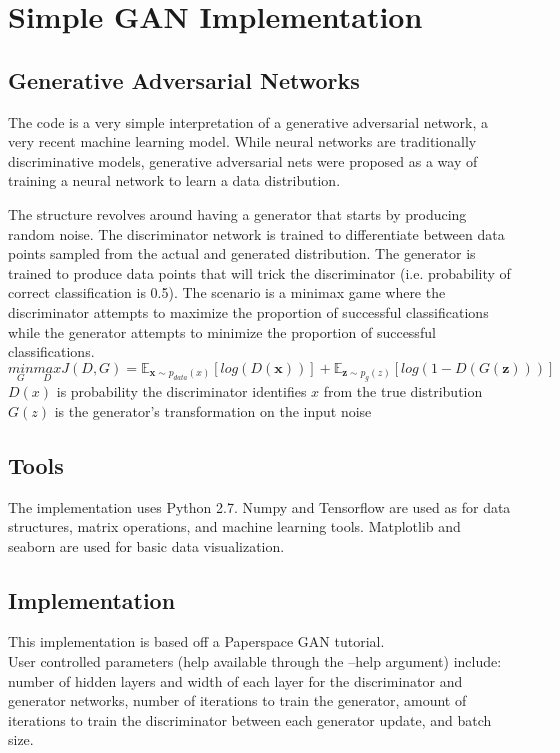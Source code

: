 \documentclass[12pt]{article}
\begin{document}
\section*{Simple GAN Implementation}

\subsection*{Generative Adversarial Networks}

\indent The code is a very simple interpretation of a generative adversarial network, a very recent machine learning model. While neural networks are traditionally discriminative models, generative adversarial nets were proposed as a way of training a neural network to learn a data distribution.

The structure revolves around having a generator that starts by producing random noise. The discriminator network is trained to differentiate between data points sampled from the actual and generated distribution. The generator is trained to produce data points that will trick the discriminator (i.e. probability of correct classification is 0.5). The scenario is a minimax game where the discriminator attempts to maximize the proportion of successful classifications while the generator attempts to minimize the proportion of successful classifications.
$$ \underset{G}{min} \underset{D}{max} J(D,G)=\mathbb{E}_{\textbf{x}\sim p_{data}(x)}[log(D(\textbf{x}))]+\mathbb{E}_{\textbf{z}\sim p_{g}(z)}[log(1-D(G(\textbf{z})))]$$
$D(x)$ is probability the discriminator identifies $x$ from the true distribution\\
$G(z)$ is the generator's transformation on the input noise

\subsection*{Tools}
\indent The implementation uses Python 2.7. Numpy and Tensorflow are used as for data structures, matrix operations, and machine learning tools. Matplotlib and seaborn are used for basic data visualization.

\subsection*{Implementation}
This implementation is based off a Paperspace GAN tutorial\cite{Paperspace Blog}.\\
User controlled parameters (help available through the --help argument) include: number of hidden layers and width of each layer for the discriminator and generator networks, number of iterations to train the generator, amount of iterations to train the discriminator between each generator update, and batch size.
\end{document}

